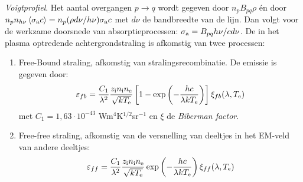\documentclass[twoside]{report}
\begin{document}
{\it Voigtprofiel}.
\npar
Het aantal overgangen $p\rightarrow q$ wordt gegeven door $n_pB_{pq}\rho$
\'en door $n_pn_{h\nu}\left\langle \sigma_{\rm a} c \right\rangle=n_p(\rho d\nu/h\nu)\sigma_{\rm a}c$
met $d\nu$ de bandbreedte van de lijn. Dan volgt voor de werkzame doorsnede
van absorptieprocessen: $\sigma_{\rm a}=B_{pq}h\nu/cd\nu$.
\npar
De in het plasma optredende achtergrondstraling is afkomstig van twee processen:
\begin{enumerate}
\item Free-Bound straling, afkomstig van stralingsrecombinatie. De emissie is
      gegeven door:
      \[
      \varepsilon_{fb}=\frac{C_1}{\lambda^2}\frac{z_{\rm i}n_{\rm i}n_{\rm e}}{\sqrt{kT_{\rm e}}}\left[1-\exp\left(-\frac{hc}{\lambda kT_{\rm e}}\right)\right]\xi_{fb}(\lambda,T_{\rm e})
      \]
      met $C_1=1,63\cdot10^{-43}$ Wm$^4$K$^{1/2}$sr$^{-1}$ en $\xi$ de
      {\it Biberman factor}.
\item Free-free straling, afkomstig van de versnelling van deeltjes in het
      EM-veld van andere deeltjes:
      \[
      \varepsilon_{ff}=\frac{C_1}{\lambda^2}\frac{z_{\rm i}n_{\rm i}n_{\rm e}}{\sqrt{kT_{\rm e}}}\exp\left(-\frac{hc}{\lambda kT_{\rm e}}\right)\xi_{ff}(\lambda,T_{\rm e})
      \]
\end{enumerate}
\end{document}
